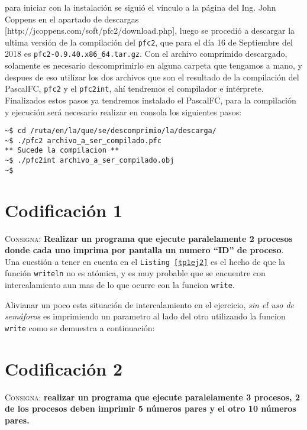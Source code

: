 \documentclass{article}
\begin{document}
para iniciar con la instalaci\'on se sigui\'o el v\'inculo a la p\'agina del Ing. John Coppens en el apartado de descargas [http://jcoppens.com/soft/pfc2/download.php], luego se procedi\'o a descargar la ultima versi\'on de la compilaci\'on del \texttt{pfc2}, que para el d\'ia 16 de Septiembre del 2018 es \texttt{pfc2-0.9.40.x86\_64.tar.gz}. Con el archivo comprimido descargado, solamente es necesario descomprimirlo en alguna carpeta que tengamos a mano, y despues de eso utilizar los dos archivos que son el resultado de la compilaci\'on del PascalFC, \texttt{pfc2} y el \texttt{pfc2int}, ah\'i tendremos el compilador e int\'erprete.\\

Finalizados estos pasos ya tendremos instalado el PascalFC, para la compilaci\'on y ejecuci\'on ser\'a necesario realizar en consola los siguientes pasos:

\begin{lstlisting}[caption={Compilaci\'on de y ejecuci\'on con pfc2}]
~$ cd /ruta/en/la/que/se/descomprimio/la/descarga/
~$ ./pfc2 archivo_a_ser_compilado.pfc
** Sucede la compilacion **
~$ ./pfc2int archivo_a_ser_compilado.obj
~$
\end{lstlisting}

\section{Codificaci\'on 1}
\label{sec:ej2}
\textsc{Consigna}: \textbf{Realizar un programa que ejecute paralelamente 2 procesos donde cada uno imprima por pantalla un numero ``ID'' de proceso}.\\



Una cuesti\'on a tener en cuenta en el \texttt{Listing \ref{tp1ej2}} es  el hecho de que la funci\'on \texttt{writeln} no es at\'omica, y es muy probable que se encuentre con intercalamiento aun mas de lo que ocurre con la funcion \texttt{write}.

Alivianar un poco esta situaci\'on de intercalamiento en el ejercicio, \textit{sin el uso de sem\'aforos} es imprimiendo un parametro al lado del otro utilizando la funcion \texttt{write} como se demuestra a continuaci\'on:



\section{Codificaci\'on 2}
\label{sec:ej3}
\textsc{Consigna}: \textbf{realizar un programa que ejecute paralelamente 3 procesos, 2 de los procesos deben imprimir 5 n\'umeros pares y el otro 10 n\'umeros pares.}
\end{document}
